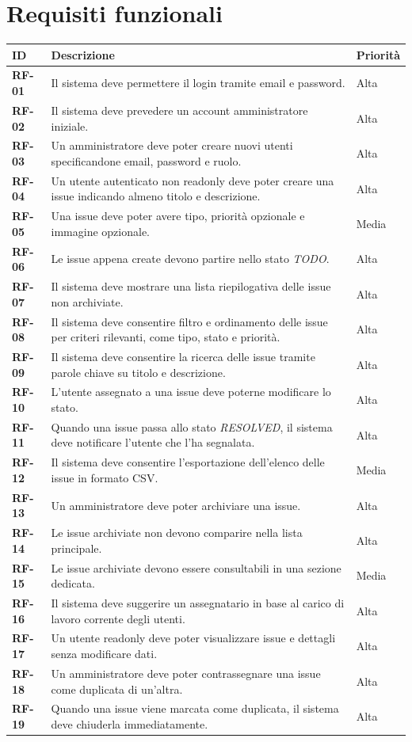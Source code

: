 \documentclass[12pt,a4paper]{article}
\begin{document}
\clearpage
\section{Requisiti funzionali}

\begin{longtable}{>{\bfseries}p{} p{} p{}}
\toprule
ID & Descrizione & Priorità \\
\midrule
RF-01 & Il sistema deve permettere il login tramite email e password. & Alta \\
RF-02 & Il sistema deve prevedere un account amministratore iniziale. & Alta \\
RF-03 & Un amministratore deve poter creare nuovi utenti specificandone email, password e ruolo. & Alta \\
RF-04 & Un utente autenticato non readonly deve poter creare una issue indicando almeno titolo e descrizione. & Alta \\
RF-05 & Una issue deve poter avere tipo, priorità opzionale e immagine opzionale. & Media \\
RF-06 & Le issue appena create devono partire nello stato \textit{TODO}. & Alta \\
RF-07 & Il sistema deve mostrare una lista riepilogativa delle issue non archiviate. & Alta \\
RF-08 & Il sistema deve consentire filtro e ordinamento delle issue per criteri rilevanti, come tipo, stato e priorità. & Alta \\
RF-09 & Il sistema deve consentire la ricerca delle issue tramite parole chiave su titolo e descrizione. & Alta \\
RF-10 & L'utente assegnato a una issue deve poterne modificare lo stato. & Alta \\
RF-11 & Quando una issue passa allo stato \textit{RESOLVED}, il sistema deve notificare l'utente che l'ha segnalata. & Alta \\
RF-12 & Il sistema deve consentire l'esportazione dell'elenco delle issue in formato CSV. & Media \\
RF-13 & Un amministratore deve poter archiviare una issue. & Alta \\
RF-14 & Le issue archiviate non devono comparire nella lista principale. & Alta \\
RF-15 & Le issue archiviate devono essere consultabili in una sezione dedicata. & Media \\
RF-16 & Il sistema deve suggerire un assegnatario in base al carico di lavoro corrente degli utenti. & Alta \\
RF-17 & Un utente readonly deve poter visualizzare issue e dettagli senza modificare dati. & Alta \\
RF-18 & Un amministratore deve poter contrassegnare una issue come duplicata di un'altra. & Alta \\
RF-19 & Quando una issue viene marcata come duplicata, il sistema deve chiuderla immediatamente. & Alta \\
\bottomrule
\end{longtable}
\end{document}
